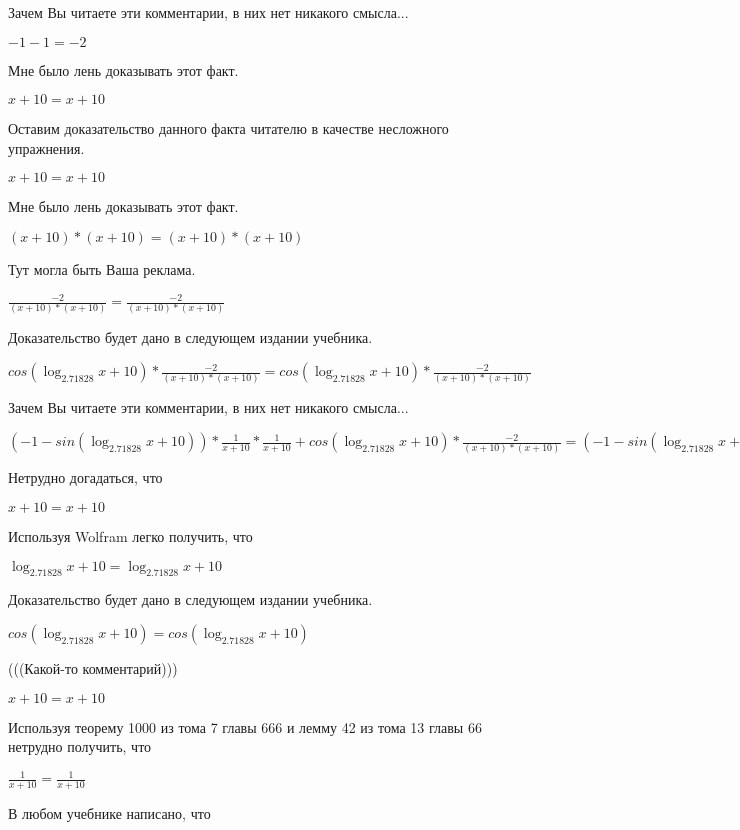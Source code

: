 \documentclass[12pt,a4paper,fleqn]{article}
\theoremstyle{definition}
\begin{document}
Зачем Вы читаете эти комментарии, в них нет никакого смысла... 

$ -1  -  1  =  -2 $

Мне было лень доказывать этот факт.

$ x  +  10  =  x  +  10 $

Оставим доказательство данного факта читателю в качестве несложного упражнения. 

$ x  +  10  =  x  +  10 $

Мне было лень доказывать этот факт.

$( x  +  10 ) * ( x  +  10 ) = ( x  +  10 ) * ( x  +  10 )$

Тут могла быть Ваша реклама. 

$\frac{ -2 }{( x  +  10 ) * ( x  +  10 )}
 = \frac{ -2 }{( x  +  10 ) * ( x  +  10 )}
$

Доказательство будет дано в следующем издании учебника. 

$cos(\log_{ 2.71828 }{ x  +  10 }) * \frac{ -2 }{( x  +  10 ) * ( x  +  10 )}
 = cos(\log_{ 2.71828 }{ x  +  10 }) * \frac{ -2 }{( x  +  10 ) * ( x  +  10 )}
$

Зачем Вы читаете эти комментарии, в них нет никакого смысла... 

$( -1  - sin(\log_{ 2.71828 }{ x  +  10 })) * \frac{ 1 }{ x  +  10 }
 * \frac{ 1 }{ x  +  10 }
 + cos(\log_{ 2.71828 }{ x  +  10 }) * \frac{ -2 }{( x  +  10 ) * ( x  +  10 )}
 = ( -1  - sin(\log_{ 2.71828 }{ x  +  10 })) * \frac{ 1 }{ x  +  10 }
 * \frac{ 1 }{ x  +  10 }
 + cos(\log_{ 2.71828 }{ x  +  10 }) * \frac{ -2 }{( x  +  10 ) * ( x  +  10 )}
$

Нетрудно догадаться, что 

$ x  +  10  =  x  +  10 $

Используя Wolfram легко получить, что 

$\log_{ 2.71828 }{ x  +  10 } = \log_{ 2.71828 }{ x  +  10 }$

Доказательство будет дано в следующем издании учебника. 

$cos(\log_{ 2.71828 }{ x  +  10 }) = cos(\log_{ 2.71828 }{ x  +  10 })$

(((Какой-то комментарий))) 

$ x  +  10  =  x  +  10 $

Используя теорему 1000 из тома 7 главы 666 и лемму 42 из тома 13 главы 66 нетрудно получить, что 

$\frac{ 1 }{ x  +  10 }
 = \frac{ 1 }{ x  +  10 }
$

В любом учебнике написано, что 
\end{document}

